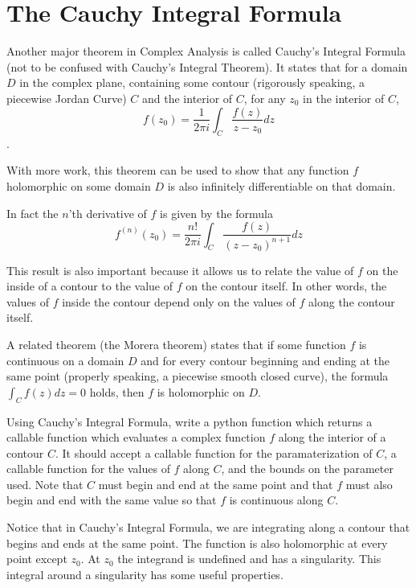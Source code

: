 \section*{The Cauchy Integral Formula}

Another major theorem in Complex Analysis is called Cauchy's Integral Formula (not to be confused with Cauchy's Integral Theorem). It states that for a domain $D$ in the complex plane, containing some contour (rigorously speaking, a piecewise Jordan Curve) $C$ and the interior of $C$, for any $z_0$ in the interior of $C$, 
$$f(z_0)=\frac{1}{2\pi i} \int_C \frac{f(z)}{z-z_0} dz$$. 

With more work, this theorem can be used to show that any function $f$ holomorphic on some domain $D$ is also infinitely differentiable on that domain.

In fact the $n$'th derivative of $f$ is given by the formula $$f^{(n)}(z_0) = \frac{n!}{2\pi i} \int_C \frac{f(z)}{(z-z_0)^{n+1}} dz$$

This result is also important because it allows us to relate the value of $f$ on the inside of a contour to the value of $f$ on the contour itself. In other words, the values of $f$ inside the contour depend only on the values of $f$ along the contour itself.

A related theorem (the Morera theorem) states that if some function $f$ is continuous on a domain $D$ and for every contour beginning and ending at the same point (properly speaking, a piecewise smooth closed curve), the formula $\int_C f(z) dz = 0$ holds, then $f$ is holomorphic on $D$. 

\begin{problem}
Using Cauchy's Integral Formula, write a python function which returns a callable function which evaluates a complex function $f$ along the interior of a contour $C$. It should accept a callable function for the paramaterization of $C$, a callable function for the values of $f$ along $C$, and the bounds on the parameter used. Note that $C$ must begin and end at the same point and that $f$ must also begin and end with the same value so that $f$ is continuous along $C$.
\end{problem}

Notice that in Cauchy's Integral Formula, we are integrating along a contour that begins and ends at the same point. The function is also holomorphic at every point except $z_0$. At $z_0$ the integrand is undefined and has a singularity. This integral around a singularity has some useful properties.

